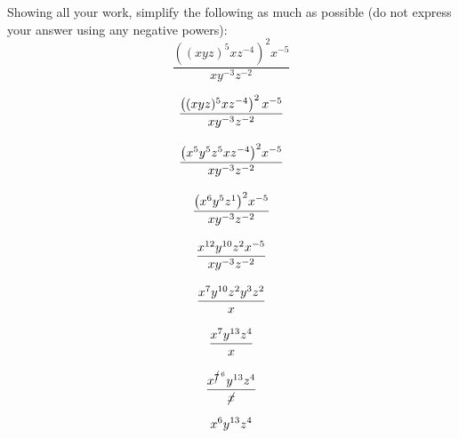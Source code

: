 \documentclass[11pt,letterpaper]{article}
\begin{document}
\newpage



 Showing all your work, simplify the following as much as possible (do not express your answer using any negative powers): 
	\[
	\dfrac{\left( (x y z)^5 x z^{-4} \right)^2 x^{-5}}{x y^{-3} z^{-2}}
	\] \pspace

\sol 
	\[
	\begin{gathered}
	\dfrac{\left( (x y z)^5 x z^{-4} \right)^2 x^{-5}}{x y^{-3} z^{-2}} \\[0.3cm]
	\dfrac{\big( x^5 y^5 z^5 x z^{-4} \big)^2 x^{-5}}{x y^{-3} z^{-2}} \\[0.3cm]
	\dfrac{ \big(x^6 y^5 z^1 \big)^2 x^{-5}}{x y^{-3} z^{-2}} \\[0.3cm]
	\dfrac{x^{12} y^{10} z^2 x^{-5}}{x y^{-3} z^{-2}} \\[0.3cm]
	\dfrac{x^7 y^{10} z^2 y^3 z^2}{x} \\[0.3cm] 
	\dfrac{x^7 y^{13} z^4}{x} \\[0.3cm]
	\dfrac{x^{\cancel{7}^{\,6}} y^{13} z^4}{\cancel{x}} \\[0.3cm]
	x^6 y^{13} z^4
	\end{gathered}
	\]
\end{document}
